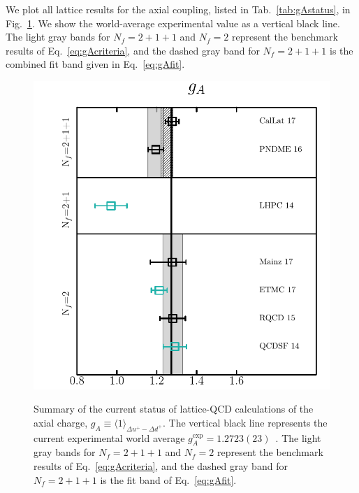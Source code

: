 We plot all lattice results for the axial coupling, listed in 
Tab.~\ref{tab:gAstatus}, in Fig.~\ref{fig:gaLQCDstatus}. 
%
We show the world-average experimental value as a vertical black line. 
%
The light gray bands for $N_f=2+1+1$ and $N_f=2$ represent the benchmark 
results of Eq.~\eqref{eq:gAcriteria}, and the dashed gray band for
$N_f=2+1+1$ is the combined fit band given in Eq.~\eqref{eq:gAfit}. 

\begin{figure}[!t]
\centering
\includegraphics[scale=0.7]{plots/ga_summary.pdf}\\
\caption{\small Summary of the current status of lattice-QCD calculations of 
the axial charge, $g_A\equiv \langle 1\rangle_{\Delta u^+-\Delta d^+}$.
%
The vertical black line represents the current experimental world average 
$g_A^{\mathrm{exp}} = 1.2723(23)$~\cite{Olive:2016xmw}. 
%
The light gray bands for $N_f=2+1+1$ and $N_f=2$ represent the benchmark 
results of Eq.~\eqref{eq:gAcriteria}, and the dashed gray band for
$N_f=2+1+1$ is the fit band of Eq.~\eqref{eq:gAfit}.}    
\label{fig:gaLQCDstatus}
\end{figure}

